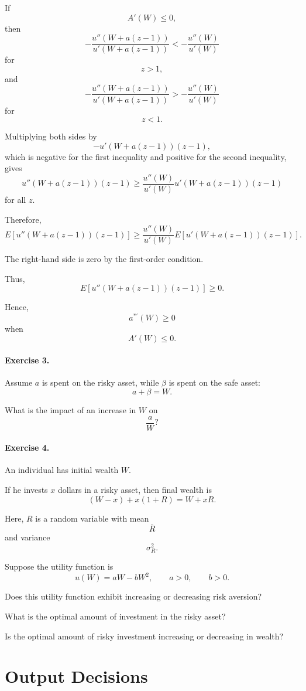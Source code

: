 If
\[
A'(W)\le 0,
\]
then
\[
-\frac{u''(W+a(z-1))}{u'(W+a(z-1))}
<
-\frac{u''(W)}{u'(W)}
\]
for
\[
z>1,
\]
and
\[
-\frac{u''(W+a(z-1))}{u'(W+a(z-1))}
>
-\frac{u''(W)}{u'(W)}
\]
for
\[
z<1.
\]

Multiplying both sides by
\[
-u'(W+a(z-1))(z-1),
\]
which is negative for the first inequality and positive for the second inequality, gives
\[
u''(W+a(z-1))(z-1)
\ge
\frac{u''(W)}{u'(W)}
u'(W+a(z-1))(z-1)
\]
for all \(z\).

Therefore,
\[
E[u''(W+a(z-1))(z-1)]
\ge
\frac{u''(W)}{u'(W)}
E[u'(W+a(z-1))(z-1)].
\]

The right-hand side is zero by the first-order condition.

Thus,
\[
E[u''(W+a(z-1))(z-1)]\ge 0.
\]

Hence,
\[
a^{*'}(W)\ge 0
\]
when
\[
A'(W)\le 0.
\]

\paragraph{Exercise 3.}

Assume \(a\) is spent on the risky asset, while \(\beta\) is spent on the safe asset:
\[
a+\beta=W.
\]

What is the impact of an increase in \(W\) on
\[
\frac{a}{W}?
\]


\paragraph{Exercise 4.}

An individual has initial wealth \(W\).

If he invests \(x\) dollars in a risky asset, then final wealth is
\[
(W-x)+x(1+R)=W+xR.
\]

Here, \(R\) is a random variable with mean
\[
\bar R
\]
and variance
\[
\sigma_R^2.
\]

Suppose the utility function is
\[
u(W)=aW-bW^2,
\qquad
a>0,
\qquad
b>0.
\]

Does this utility function exhibit increasing or decreasing risk aversion?

What is the optimal amount of investment in the risky asset?

Is the optimal amount of risky investment increasing or decreasing in wealth?

\section{Output Decisions}

